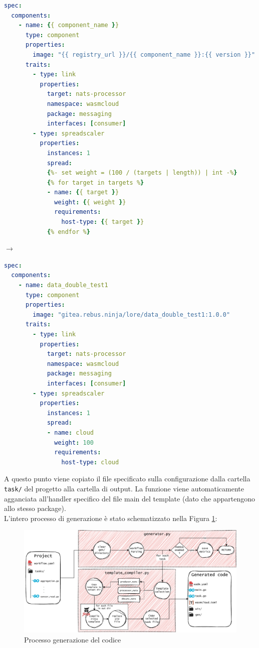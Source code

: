 \noindent\begin{minipage}{.46\textwidth}
\begin{lstlisting}[caption=Template wadm.yaml, language=yaml, basicstyle=\scriptsize, frame=single, label={code:jinja_before}]
spec:
  components:
    - name: {{ component_name }}
      type: component
      properties:
        image: "{{ registry_url }}/{{ component_name }}:{{ version }}"
      traits:
        - type: link
          properties:
            target: nats-processor
            namespace: wasmcloud
            package: messaging
            interfaces: [consumer]
        - type: spreadscaler
          properties:
            instances: 1
            spread:
            {%- set weight = (100 / (targets | length)) | int -%}
            {% for target in targets %}
            - name: {{ target }}
              weight: {{ weight }}
              requirements:
                host-type: {{ target }}
            {% endfor %}
\end{lstlisting}
\end{minipage}
\hfill
$\rightarrow$
\hfill
\begin{minipage}{.46\textwidth}
\begin{lstlisting}[caption=wadm.yaml compilato con Jinja, language=yaml, basicstyle=\scriptsize, frame=single, label={code:jinja_after}]
spec:
  components:
    - name: data_double_test1
      type: component
      properties:
        image: "gitea.rebus.ninja/lore/data_double_test1:1.0.0"
      traits:
        - type: link
          properties:
            target: nats-processor
            namespace: wasmcloud
            package: messaging
            interfaces: [consumer]
        - type: spreadscaler
          properties:
            instances: 1
            spread:
            - name: cloud
              weight: 100
              requirements:
                host-type: cloud
\end{lstlisting}
\end{minipage}

A questo punto viene copiato il file specificato sulla configurazione dalla cartella \texttt{task/} del progetto alla cartella di output. La funzione viene automaticamente agganciata all'handler specifico del file main del template (dato che appartengono allo stesso package).\\

L'intero processo di generazione è stato schematizzato nella Figura \ref{fig:code_gen_impl}:

\FloatBarrier
\begin{figure}[h]
    \centering
    \includegraphics[width=\textwidth]{img/schemi/schemi-implementazione-gen.drawio.pdf}
    \caption{Processo generazione del codice}
    \label{fig:code_gen_impl}
\end{figure}
\FloatBarrier